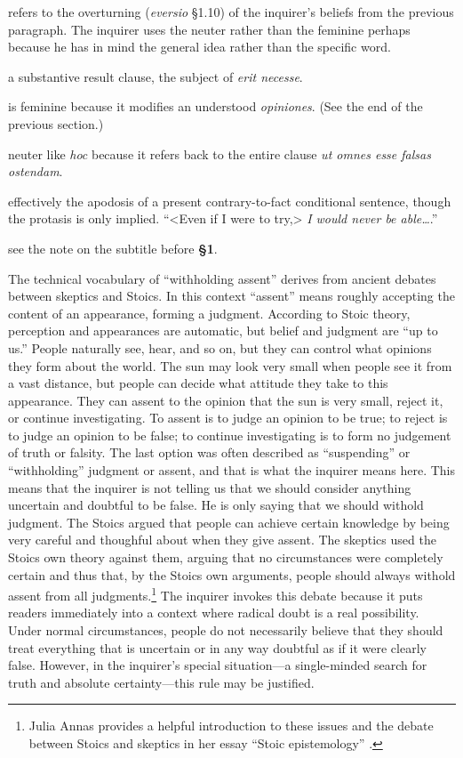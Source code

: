  refers to the overturning (\textit{eversio} §1.10) of the inquirer's beliefs from the previous paragraph. The inquirer uses the neuter rather than the feminine perhaps because he has in mind the general idea rather than the specific word.

 a substantive result clause, the subject of \textit{erit necesse}.

 is feminine because it modifies an understood \textit{opiniones}. (See the end of the previous section.)

 neuter like \textit{hoc} because it refers back to the entire clause \textit{ut omnes esse falsas ostendam}.

 effectively the apodosis of a present contrary-to-fact conditional sentence, though the protasis is only implied. ``<Even if I were to try,> \textit{I would never be able\dots}.''

 see the note on the subtitle before \textbf{§1}.

 The technical vocabulary of ``withholding assent'' derives from ancient debates between skeptics and Stoics. In this context ``assent'' means roughly accepting the content of an appearance, forming a judgment. According to Stoic theory, perception and appearances are automatic, but belief and judgment are ``up to us.'' People naturally see, hear, and so on, but they can control what opinions they form about the world. The sun may look very small when people see it from a vast distance, but people can decide what attitude they take to this appearance. They can assent to the opinion that the sun is very small, reject it, or continue investigating. To assent is to judge an opinion to be true; to reject is to judge an opinion to be false; to continue investigating is to form no judgement of truth or falsity. The last option was often described as ``suspending'' or ``withholding'' judgment or assent, and that is what the inquirer means here. This means that the inquirer is not telling us that we should consider anything uncertain and doubtful to be false. He is only saying that we should withold judgment. The Stoics argued that people can achieve certain knowledge by being very careful and thoughful about when they give assent. The skeptics used the Stoics own theory against them, arguing that no circumstances were completely certain and thus that, by the Stoics own arguments, people should always withold assent from all judgments.\footnote{Julia Annas provides a helpful introduction to these issues and the debate between Stoics and skeptics in her essay ``Stoic epistemology'' \parencite{annas1990}.} The inquirer invokes this debate because it puts readers immediately into a context where radical doubt is a real possibility. Under normal circumstances, people do not necessarily believe that they should treat everything that is uncertain or in any way doubtful as if it were clearly false. However, in the inquirer's special situation---a single-minded search for truth and absolute certainty---this rule may be justified.

